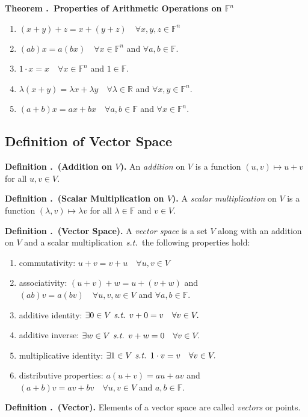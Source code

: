 \documentclass[11pt, letterpaper]{article}
\newcounter{ndf}[subsection]
\newenvironment*{df}[1]{\par\noindent\textbf{Definition \thesubsection.\stepcounter{ndf}\thendf\ (#1).}}{\par}
\newcounter{nthm}[subsection]
\newenvironment*{thm}[1]{\begin{framed}\par\noindent\textbf{Theorem \thesubsection.\stepcounter{nthm}\thenthm\ #1} \par}{\par\end{framed}}
\def\R{\mathbb{R}}
\def\F{\mathbb{F}}
\def\st{\emph{ s.t. }}
\begin{document}
\begin{thm}{Properties of Arithmetic Operations on $\F^n$}
	\begin{enumerate}
		\item $(x+y)+z=x+(y+z)\quad\forall x,y,z\in\F^n$
		\item $(ab)x=a(bx)\quad\forall x\in\F^n$ and $\forall a,b\in\F.$
		\item $1\cdot x=x\quad\forall x\in\F^n$ and $1\in\F.$
		\item $\lambda(x+y)=\lambda x+\lambda y\quad\forall\lambda\in\R$ and $\forall x,y\in\F^n.$
		\item $(a+b)x=ax+bx\quad\forall a,b\in\F$ and $\forall x\in\F^n.$
	\end{enumerate}
\end{thm}

\newpage
\subsection{Definition of Vector Space}
\begin{df}{Addition on $V$}
	An \textit{addition} on $V$ is a function $(u,v)\mapsto u+v$ for all $u,v\in V.$	
\end{df}
\begin{df}{Scalar Multiplication on $V$}
	A \textit{scalar multiplication} on $V$ is a function $(\lambda,v)\mapsto \lambda v$ for all $\lambda\in\F$ and $v\in V.$	
\end{df}
\begin{df}{Vector Space}
	A \textit{vector space} is a set $V$ along with an addition on $V$ and a scalar multiplication$\st$the following properties hold: 
	\begin{enumerate}
		\item commutativity: $u+v=v+u\quad\forall u,v\in V$
		\item associativity: $(u+v)+w=u+(v+w)$ and $(ab)v=a(bv)\quad\forall u,v,w\in V$ and $\forall a,b\in\F.$
		\item additive identity: $\exists0\in V\st v+0=v\quad\forall v\in V.$
		\item additive inverse: $\exists w\in V\st v+w=0\quad\forall v\in V.$
		\item multiplicative identity: $\exists1\in V\st1\cdot v=v\quad\forall v\in V.$
		\item distributive properties: $a(u+v)=au+av$ and $(a+b)v=av+bv\quad\forall u,v\in V$ and $a,b\in\F.$
	\end{enumerate}
\end{df}
\begin{df}{Vector}
	Elements of a vector space are called \textit{vectors} or points.	
\end{df}
\end{document}
